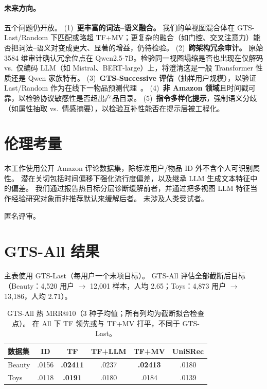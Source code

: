\documentclass[sigconf,natbib=true,anonymous]{acmart}
\newcommand{\tfmv}{\textsc{TF+MV}\xspace}
\begin{document}
\paragraph{未来方向。}
五个问题仍开放。
(1)~\textbf{更丰富的词法--语义融合。} 我们的单视图混合体在 GTS-Last/Random 下匹配或略超 \tfmv；更复杂的融合（如门控、交叉注意力）能否把词法--语义对变成更大、显著的增益，仍待检验。
(2)~\textbf{跨架构冗余审计。} 原始 3584 维审计确认冗余位点在 Qwen2.5-7B。检验同一视图塌缩是否也出现在仅解码 vs.\ 仅编码 LLM（如 Mistral、BERT-large）上，将澄清这是一般 Transformer 性质还是 Qwen 家族特有。
(3)~\textbf{GTS-Successive 评估}（抽样用户规模），以验证 Last/Random 作为在线下一物品预测代理~\cite{gusak2025time}。
(4)~\textbf{非 Amazon 领域}且时间戳可靠，以检验协议敏感性是否超出产品目录。
(5)~\textbf{指令多样化提示}，强制语义分歧（如属性抽取 vs.\ 情感摘要），以检验互补性能否在提示层被工程化。

\section*{伦理考量}
本工作使用公开 Amazon 评论数据集，除标准用户/物品 ID 外不含个人可识别属性。
潜在关切包括时间偏移下强化流行度偏差，以及继承 LLM 生成文本特征中的偏差。
我们通过报告热目标分层诊断缓解前者，并通过把多视图 LLM 特征当作经验研究对象而非推荐默认来缓解后者。
未涉及人类受试者。

\begin{acks}
匿名评审。
\end{acks}

\appendix

\section{GTS-All 结果}
\label{app:gts-all}

主表使用 GTS-Last（每用户一个末项目标）。
GTS-All 评估全部截断后目标（Beauty：4{,}520 用户 $\to$ 12{,}001 样本，人均 2.65；Toys：4{,}873 用户 $\to$ 13{,}186，人均 2.71）。

\begin{table}[h]
\centering
\caption{GTS-All 热 MRR@10（3 种子均值；所有列均为截断拟合检查点）。
在 All 下 TF 领先或与 \tfmv 打平，不同于 GTS-Last。}
\label{tab:gts-all}
\small
\begin{tabular}{@{}lccccc@{}}
\toprule
数据集 & ID & TF & TF+LLM & TF+MV & UniSRec \\
\midrule
Beauty & .0156 & \textbf{.02411} & .0237 & \textbf{.02413} & .0180 \\
Toys   & .0118 & \textbf{.0191} & .0180 & .0184 & .0139 \\
\bottomrule
\end{tabular}
\end{table}
\end{document}
